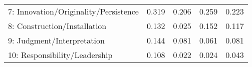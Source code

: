 \begin{tabular}{lcccc}
7: Innovation/Originality/Persistence & 0.319\newline[0.313, 0.325] & 0.206\newline[0.200, 0.213] & 0.259\newline[0.244, 0.275] & 0.223\newline[0.210, 0.236]\\
8: Construction/Installation & 0.132\newline[0.126, 0.139] & 0.025\newline[0.021, 0.030] & 0.152\newline[0.129, 0.175] & 0.117\newline[0.103, 0.130]\\
9: Judgment/Interpretation & 0.144\newline[0.137, 0.151] & 0.081\newline[0.073, 0.089] & 0.061\newline[0.046, 0.076] & 0.081\newline[0.067, 0.095]\\
10: Responsibility/Leadership & 0.108\newline[0.101, 0.114] & 0.022\newline[0.015, 0.030] & 0.024\newline[0.010, 0.038] & 0.043\newline[0.029, 0.057]\\
\bottomrule
\end{tabular}
